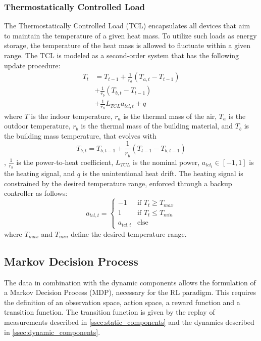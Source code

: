 \subsubsection{Thermostatically Controlled Load}
The Thermostatically Controlled Load (TCL) encapsulates all devices that aim to maintain the temperature of a given heat mass. To utilize such loads as energy storage, the temperature of the heat mass is allowed to fluctuate within a given range. The TCL is modeled as a second-order system \cite{Sonderegger.1978} that has the following update procedure:
\begin{equation}
    \begin{split}
        T_t &= T_{t-1} + \frac{1}{r_a} (T_{a, t} - T_{t-1}) \\
        &+ \frac{1}{r_b} (T_{b,t} - T_{t-1}) \\
        &+ \frac{1}{r_h} L_{TCL} a_{tcl,t} + q
    \end{split}
\end{equation}
where $T$ is the indoor temperature, $r_a$ is the thermal mass of the air, $T_{a}$ is the outdoor temperature, $r_b$ is the thermal mass of the building material, and $T_{b}$ is the  building mass temperature, that evolves with
\begin{equation}
    T_{b, t} = T_{b, t-1} + \frac{1}{r_b} (T_{t-1} - T_{b, t-1})
\end{equation},
$\frac{1}{r_h}$ is the power-to-heat coefficient, $L_{TCL}$ is the nominal power, 
$a_{tcl_t} \in [-1, 1]$ is the heating signal, and $q$ is the unintentional heat drift. The heating signal is constrained by the desired temperature range, enforced through a backup controller as follows:
\begin{equation}
    a_{tcl, t} = \begin{cases}
        -1 & \text{if } T_t \geq T_{max} \\
        1 & \text{if } T_t \leq T_{min} \\
        a_{tcl, t} & \text{else} 
    \end{cases}
\end{equation}
where $T_{max}$ and $T_{min}$ define the desired temperature range. 

\subsection{Markov Decision Process}
The data in combination with the dynamic components allows the formulation of a Markov Decision Process (MDP), necessary for the RL paradigm. This requires the definition of an observation space, action space, a reward function and a transition function. The transition function is given by the replay of measurements described in \ref{ssec:static_components} and the dynamics described in \ref{ssec:dynamic_components}.

